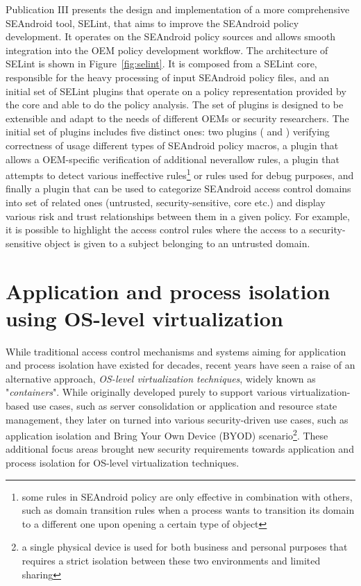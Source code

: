 Publication III presents the design and implementation of a more comprehensive SEAndroid tool, SELint, that aims to improve the SEAndroid policy development. It operates on the SEAndroid policy sources and allows smooth integration into the OEM policy development workflow. The architecture of SELint is shown in Figure~\ref{fig:selint}. It is composed from a SELint core, responsible for the heavy processing of input SEAndroid policy files, and an initial set of SELint plugins that operate on a policy representation provided by the core and able to do the policy analysis. The set of plugins is designed to be extensible and adapt to the needs of different OEMs or security researchers. The initial set of plugins includes five distinct ones: two plugins ( and ) verifying correctness of usage different types of SEAndroid policy macros, a  plugin that allows a OEM-specific verification of additional neverallow rules, a  plugin that attempts to detect various ineffective rules\footnote{some rules in SEAndroid policy are only effective in combination with others, such as domain transition rules when a process wants to transition its domain to a different one upon opening a certain type of object} or rules used for debug purposes, and finally a  plugin that can be used to categorize SEAndroid access control domains into set of related ones (untrusted, security-sensitive, core etc.) and display various risk and trust relationships between them in a given policy. For example, it is possible to highlight the access control rules where the access to a security-sensitive object is given to a subject belonging to an untrusted domain.


\section{Application and process isolation using OS-level virtualization}
\label{sec:os-virt}

While traditional access control mechanisms and systems aiming for application and process isolation have existed for decades, recent years have seen a raise of an alternative approach, \textit{OS-level virtualization techniques}, widely known as "\textit{containers}". While originally developed purely to support various virtualization-based use cases, such as server consolidation or application and resource state management, they later on turned into various security-driven use cases, such as application isolation and Bring Your Own Device (BYOD) scenario\footnote{a single physical device is used for both business and personal purposes that requires a strict isolation between these two environments and limited sharing}. These additional focus areas brought new security requirements towards application and process isolation for OS-level virtualization techniques.

